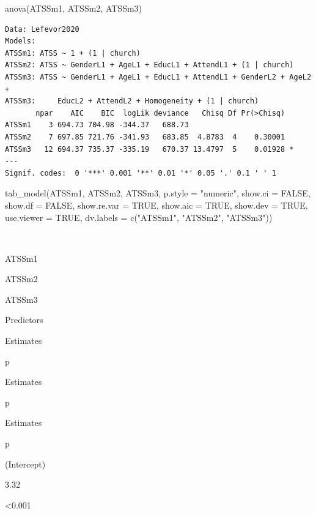 \documentclass[
  english,
]{book}
\newenvironment{Shaded}{\begin{snugshade}}{\end{snugshade}}
\newcommand{\AttributeTok}[1]{\textcolor[rgb]{0.77,0.63,0.00}{#1}}
\newcommand{\ConstantTok}[1]{\textcolor[rgb]{0.00,0.00,0.00}{#1}}
\newcommand{\FunctionTok}[1]{\textcolor[rgb]{0.00,0.00,0.00}{#1}}
\newcommand{\NormalTok}[1]{#1}
\newcommand{\StringTok}[1]{\textcolor[rgb]{0.31,0.60,0.02}{#1}}
\begin{document}
\begin{Shaded}
\begin{Highlighting}[]
\FunctionTok{anova}\NormalTok{(ATSSm1, ATSSm2, ATSSm3) }
\end{Highlighting}
\end{Shaded}

\begin{verbatim}
Data: Lefevor2020
Models:
ATSSm1: ATSS ~ 1 + (1 | church)
ATSSm2: ATSS ~ GenderL1 + AgeL1 + EducL1 + AttendL1 + (1 | church)
ATSSm3: ATSS ~ GenderL1 + AgeL1 + EducL1 + AttendL1 + GenderL2 + AgeL2 + 
ATSSm3:     EducL2 + AttendL2 + Homogeneity + (1 | church)
       npar    AIC    BIC  logLik deviance   Chisq Df Pr(>Chisq)  
ATSSm1    3 694.73 704.98 -344.37   688.73                        
ATSSm2    7 697.85 721.76 -341.93   683.85  4.8783  4    0.30001  
ATSSm3   12 694.37 735.37 -335.19   670.37 13.4797  5    0.01928 *
---
Signif. codes:  0 '***' 0.001 '**' 0.01 '*' 0.05 '.' 0.1 ' ' 1
\end{verbatim}

\begin{Shaded}
\begin{Highlighting}[]
\FunctionTok{tab\_model}\NormalTok{(ATSSm1, ATSSm2, ATSSm3, }\AttributeTok{p.style =} \StringTok{"numeric"}\NormalTok{, }\AttributeTok{show.ci =} \ConstantTok{FALSE}\NormalTok{, }\AttributeTok{show.df =} \ConstantTok{FALSE}\NormalTok{, }\AttributeTok{show.re.var =} \ConstantTok{TRUE}\NormalTok{, }\AttributeTok{show.aic =} \ConstantTok{TRUE}\NormalTok{, }\AttributeTok{show.dev =} \ConstantTok{TRUE}\NormalTok{, }\AttributeTok{use.viewer =} \ConstantTok{TRUE}\NormalTok{, }\AttributeTok{dv.labels =} \FunctionTok{c}\NormalTok{(}\StringTok{"ATSSm1"}\NormalTok{, }\StringTok{"ATSSm2"}\NormalTok{, }\StringTok{"ATSSm3"}\NormalTok{))}
\end{Highlighting}
\end{Shaded}

~

ATSSm1

ATSSm2

ATSSm3

Predictors

Estimates

p

Estimates

p

Estimates

p

(Intercept)

3.32

\textless0.001
\end{document}
